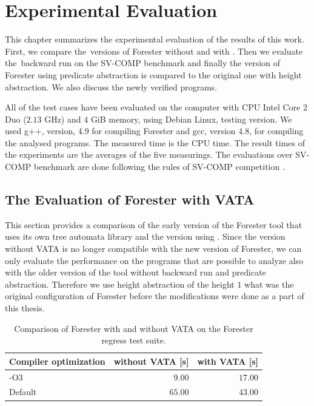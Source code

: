 \chapter{Experimental Evaluation}
\label{ch:eval}

This chapter summarizes the experimental evaluation of the results of this work.
First, we compare the~versions of Forester without and with \vata.
Then we evaluate the~backward run on the SV-COMP benchmark
and finally the version of Forester using predicate abstraction is compared to the
original one with height abstraction.
We also discuss the newly verified programs.

All of the test cases have been evaluated on the computer with CPU Intel Core $2$ Duo ($2.13$ GHz)
and $4$ GiB memory, using Debian Linux, testing version.
We used g++, version, 4.9 for compiling Forester and gcc, version 4.8,
for compiling the analysed programs.
The measured time is the CPU time.
The result times of the experiments are the averages of the five measurings.
The evaluations over SV-COMP benchmark are done following the rules of
SV-COMP competition \cite{www:svcomp}.

\section{The Evaluation of Forester with VATA}

This section provides a comparison of the early version of the Forester tool
that uses its own tree automata library and the version using \vata.
Since the version without VATA is no longer compatible with the
new version of Forester, we can only evaluate the performance
on the programs that are possible to analyze also with the older
version of the tool without backward run and predicate abstraction.
Therefore we use height abstraction of the height $1$
what was the original configuration of Forester before the
modifications were done as a part of this thesis.

\begin{table}[bt]
	\vskip6pt
	\caption{Comparison of Forester with and without VATA on the Forester regress test suite.
	}
	\centering
	\begin{tabular}{|l | r | r |}
		\hline
		Compiler optimization & without VATA [s] & with VATA [s] \\
		\hline
		\hline
		-O3        & $9.00$ & $17.00$ \\
		\hline
		Default    & $65.00$ & $43.00$ \\
		\hline
	\end{tabular}
	\label{tab:vataregre}
\end{table}

